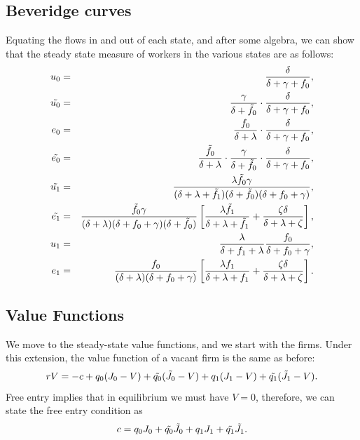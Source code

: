 \documentclass[12pt]{article} %
\theoremstyle{definition}
\begin{document}
\subsection*{Beveridge curves}\label{regain beveridge}
Equating the flows in and out of each state, and after some algebra, we can show that the steady state measure of workers in the various states are as follows:
\begin{eqnarray}
u_0 &=& \frac{\delta}{\delta+\gamma+f_0},  \\
\tilde{u_0} &=& \frac{\gamma}{\delta+\Tilde{f_0}} \cdot  \frac{\delta}{\delta+\gamma+f_0}, \\
e_0 &=& \frac{f_0}{\delta+\lambda} \cdot \frac{\delta}{\delta+\gamma+f_0}, \\
\Tilde{e_0} &=& \frac{\Tilde{f_0}}{\delta+\lambda} \cdot \frac{\gamma}{\delta + \Tilde{f_0}} \cdot \frac{\delta}{\delta+\gamma+f_0},  \\
 \tilde{u_1} &=& \frac{\lambda \Tilde{f_0} \gamma}{(\delta+\lambda+\Tilde{f_1})(\delta+\Tilde{f_0})(\delta+f_0+\gamma)}, \\
  \tilde{e_1} &=& \frac{\Tilde{f_0} \gamma}{(\delta+\lambda)(\delta+f_0+\gamma)(\delta+\Tilde{f_0})} \left[\frac{\lambda \Tilde{f_1}}{\delta+\lambda+\Tilde{f_1}} + \frac{\zeta \delta}{\delta+\lambda+\zeta}\right],   \\
  u_1 &=& \frac{\lambda}{\delta+f_1+\lambda}\frac{f_0}{\delta+f_0+\gamma},  \\
  e_1 &=& \frac{f_0}{(\delta+\lambda)(\delta+f_0+\gamma)}\left[\frac{\lambda f_1}{\delta+\lambda+f_1} +\frac{\zeta \delta}{\delta + \lambda + \zeta} \right]. 
 \end{eqnarray}

\subsection*{Value Functions}
We move to the steady-state value functions, and we start with the firms. Under this extension, the value function of a vacant firm is the same as before:
\begin{equation}
   rV = -c + q_0 (J_0-V) + \Tilde{q_0}(\Tilde{J_0}-V) + q_1 (J_1-V) + \Tilde{q_1}(\Tilde{J_1}-V).\nonumber 
\end{equation}
Free entry implies that in equilibrium we must have $V=0$, therefore, we can state the free entry condition as 
\begin{equation}
   c = q_0 J_0 + \Tilde{q_0}\Tilde{J_0} + q_1 J_1 + \Tilde{q_1}\Tilde{J_1}. 
\end{equation}
\end{document}
